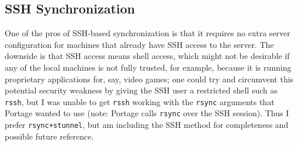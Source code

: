 \documentclass{article}
\begin{document}
\subsection{SSH Synchronization}
One of the pros of SSH-based synchronization is that it requires no extra server configuration for machines that already have SSH access to the server.  The downside is that SSH access means shell access, which might not be desirable if any of the local machines is not fully trusted, for example, because it is running proprietary applications for, say, video games; one could try and circumvent this potential security weakness by giving the SSH user a restricted shell such as \texttt{rssh}, but I was unable to get \texttt{rssh} working with the \texttt{rsync} arguments that Portage wanted to use (note: Portage calls \texttt{rsync} over the SSH session).  Thus I prefer \texttt{rsync+stunnel}, but am including the SSH method for completeness and possible future reference.
\end{document}
